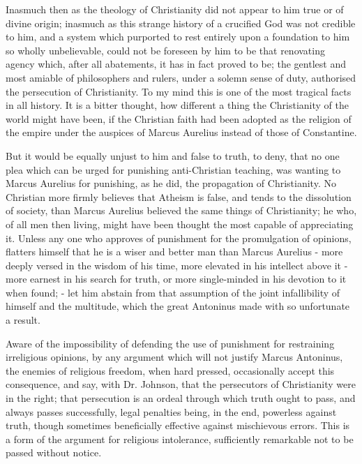 Inasmuch then as the theology of Christianity did not appear to him true or of divine origin; inasmuch as this strange history of a crucified God was not credible to him, and a system which purported to rest entirely upon a foundation to him so wholly unbelievable, could not be foreseen by him to be that renovating agency which, after all abatements, it has in fact proved to be; the gentlest and most amiable of philosophers and rulers, under a solemn sense of duty, authorised the persecution of Christianity. To my mind this is one of the most tragical facts in all history. It is a bitter thought, how different a thing the Christianity of the world might have been, if the Christian faith had been adopted as the religion of the empire under the auspices of Marcus Aurelius instead of those of Constantine.\par

But it would be equally unjust to him and false to truth, to deny, that no one plea which can be urged for punishing anti-Christian teaching, was wanting to Marcus Aurelius for punishing, as he did, the propagation of Christianity. No Christian more firmly believes that Atheism is false, and tends to the dissolution of society, than Marcus Aurelius believed the same things of Christianity; he who, of all men then living, might have been thought the most capable of appreciating it. Unless any one who approves of punishment for the promulgation of opinions, flatters himself that he is a wiser and better man than Marcus Aurelius - more deeply versed in the wisdom of his time, more elevated in his intellect above it - more earnest in his search for truth, or more single-minded in his devotion to it when found; - let him abstain from that assumption of the joint infallibility of himself and the multitude, which the great Antoninus made with so unfortunate a result.\par

Aware of the impossibility of defending the use of punishment for restraining irreligious opinions, by any argument which will not justify Marcus Antoninus, the enemies of religious freedom, when hard pressed, occasionally accept this consequence, and say, with Dr. Johnson, that the persecutors of Christianity were in the right; that persecution is an ordeal through which truth ought to pass, and always passes successfully, legal penalties being, in the end, powerless against truth, though sometimes beneficially effective against mischievous errors. This is a form of the argument for religious intolerance, sufficiently remarkable not to be passed without notice.\par

